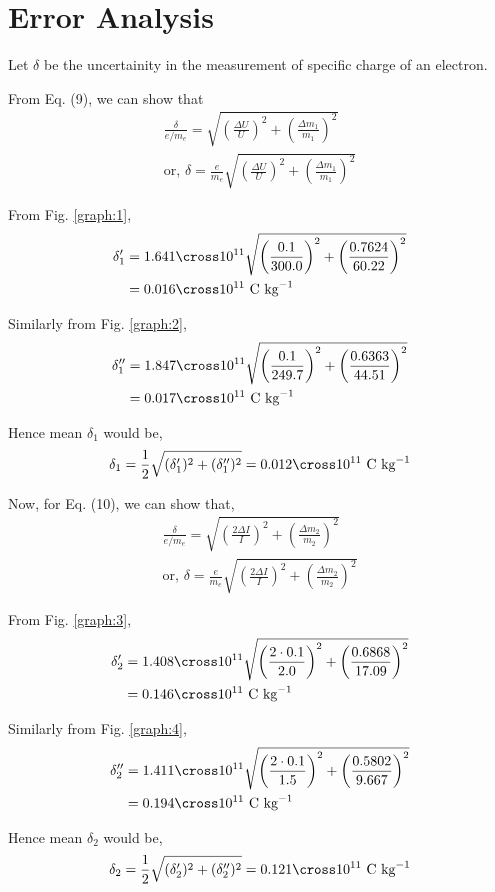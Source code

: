 \section{Error Analysis}
Let $\delta$ be the uncertainity in the measurement of specific charge of an electron.

From Eq. (9), we can show that 
\begin{align}
    \frac{\delta}{e/m_e} = \sqrt{\left(\frac{\Delta U}{U}\right)^2 + \left(\frac{\Delta m_1}{m_1}\right)^2} \nonumber\\
    \text{or, } \delta= \frac{e}{m_e}\sqrt{\left(\frac{\Delta U}{U}\right)^2 + \left(\frac{\Delta m_1}{m_1}\right)^2}
\end{align}

From Fig. \ref*{graph:1}, 
\begin{align*}
    \delta'_1 &= 1.641\cross10^{11}\sqrt{\left(\frac{0.1}{300.0}\right)^2 + \left(\frac{0.7624}{60.22}\right)^2}\\
    &=0.016\cross10^{11} \text{ C kg}^{-1}
\end{align*}

Similarly from Fig. \ref*{graph:2}, 
\begin{align*}
    \delta''_1 &= 1.847\cross10^{11}\sqrt{\left(\frac{0.1}{249.7}\right)^2 + \left(\frac{0.6363}{44.51}\right)^2}\\
    &=0.017\cross10^{11} \text{ C kg}^{-1}
\end{align*}

Hence mean $\delta_1$ would be,
\begin{align*}
    \delta_1 = \frac{1}{2}\sqrt{(\delta'_1)^2 + (\delta''_1)^2} = 0.012\cross10^{11} \text{ C kg}^{-1}
\end{align*}

Now, for Eq. (10), we can show that,
\begin{align}
    \frac{\delta}{e/m_e} = \sqrt{\left(\frac{2\Delta I}{I}\right)^2 + \left(\frac{\Delta m_2}{m_2}\right)^2} \nonumber\\
    \text{or, } \delta= \frac{e}{m_e}\sqrt{\left(\frac{2\Delta I}{I}\right)^2 + \left(\frac{\Delta m_2}{m_2}\right)^2}
\end{align}

From Fig. \ref*{graph:3}, 
\begin{align*}
    \delta'_2 &= 1.408\cross10^{11}\sqrt{\left(\frac{2\cdot0.1}{2.0}\right)^2 + \left(\frac{0.6868}{17.09}\right)^2}\\
    &=0.146\cross10^{11} \text{ C kg}^{-1}
\end{align*}

Similarly from Fig. \ref*{graph:4}, 
\begin{align*}
    \delta''_2 &= 1.411\cross10^{11}\sqrt{\left(\frac{2\cdot0.1}{1.5}\right)^2 + \left(\frac{0.5802}{9.667}\right)^2}\\
    &=0.194\cross10^{11} \text{ C kg}^{-1}
\end{align*}

Hence mean $\delta_2$ would be,
\begin{align*}
    \delta_2 = \frac{1}{2}\sqrt{(\delta'_2)^2 + (\delta''_2)^2} = 0.121\cross10^{11} \text{ C kg}^{-1}
\end{align*}